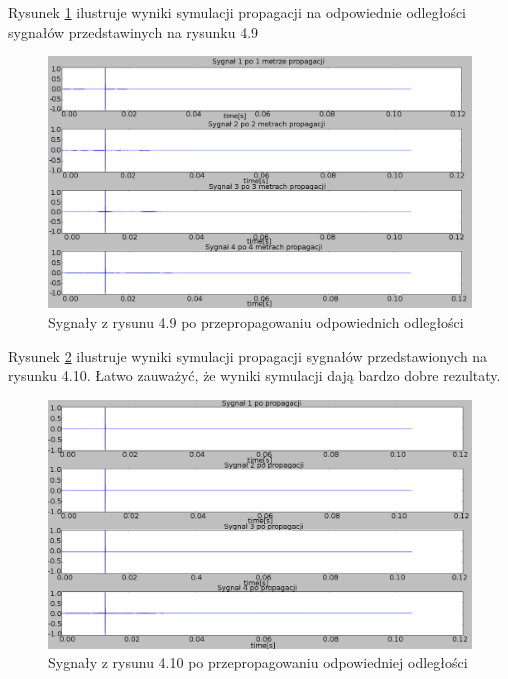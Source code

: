 Rysunek \ref{fig:skompensowane_TR} ilustruje wyniki symulacji propagacji na odpowiednie odległości sygnałów przedstawinych na rysunku 4.9
\begin{figure}[h]
\centering
\includegraphics[width=14cm]{Zdjecia/4/skompensowane_TR}
\caption{Sygnały  z rysunu 4.9 po przepropagowaniu odpowiednich odległości}
\label{fig:skompensowane_TR}
\end{figure}

Rysunek \ref{fig:tr_rozna_il_postaci_skomp} ilustruje wyniki  symulacji propagacji sygnałów przedstawionych na rysunku 4.10. Łatwo zauważyć, że wyniki symulacji dają bardzo dobre rezultaty. 
\begin{figure}[h]
\centering
\includegraphics[width=14cm]{Zdjecia/4/tr_rozna_il_postaci_skomp}
\caption{Sygnały  z rysunu 4.10 po przepropagowaniu odpowiedniej odległości}
\label{fig:tr_rozna_il_postaci_skomp}
\end{figure} 

